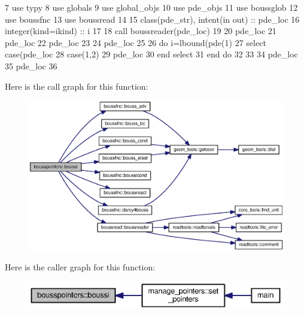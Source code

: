\begin{DoxyCode}
7       \textcolor{keywordtype}{use }typy
8       \textcolor{keywordtype}{use }globals
9       \textcolor{keywordtype}{use }global_objs
10       \textcolor{keywordtype}{use }pde_objs
11       \textcolor{keywordtype}{use }boussglob
12       \textcolor{keywordtype}{use }boussfnc
13       \textcolor{keywordtype}{use }boussread
14         
15       \textcolor{keywordtype}{class}(pde_str), \textcolor{keywordtype}{intent(in out)} :: pde\_loc
16       \textcolor{keywordtype}{integer(kind=ikind)} :: i
17       
18       \textcolor{keyword}{call }boussreader(pde\_loc)
19       
20       pde\_loc%
21       pde\_loc%
22       pde\_loc%
23 
24       pde\_loc%
25           
26       \textcolor{keywordflow}{do} i=lbound(pde(1)%
27         \textcolor{keywordflow}{select case}(pde\_loc%
28           \textcolor{keywordflow}{case}(1,2)
29             pde\_loc%
30 \textcolor{keywordflow}{        end select}
31 \textcolor{keywordflow}{      end do}
32               
33         
34       pde\_loc%
35       pde\_loc%
36        
\end{DoxyCode}


Here is the call graph for this function\+:\nopagebreak
\begin{figure}[H]
\begin{center}
\leavevmode
\includegraphics[width=350pt]{namespacebousspointers_aa29fe327913d573ed19bbd1a6b11f0b5_cgraph}
\end{center}
\end{figure}




Here is the caller graph for this function\+:\nopagebreak
\begin{figure}[H]
\begin{center}
\leavevmode
\includegraphics[width=350pt]{namespacebousspointers_aa29fe327913d573ed19bbd1a6b11f0b5_icgraph}
\end{center}
\end{figure}


